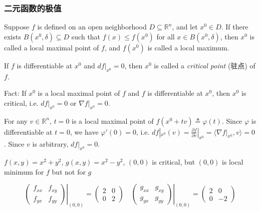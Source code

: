 \subsubsection{二元函数的极值}

\begin{definition}
    Suppose $f$ is defined on an open neighborhood $D\subseteq\mathbb{R}^n$, and let $x^0\in D$. If there exists $B(x^0,\delta)\subseteq D$ such that $f(x)\leq f(x^0)$ for all $x\in B(x^0,\delta)$, then $x^0$ is called a local maximal point of $f$, and $f(x^0)$ is called a local maximum.
\end{definition}

\begin{definition}
    If $f$ is differentiable at $x^0$ and $df|_{x^0}=0$, then $x^0$ is called a \emph{critical point} (驻点) of $f$.
\end{definition}

Fact: If $x^0$ is a local maximal point of $f$ and $f$ is differentiable at $x^0$, then $x^0$ is critical, i.e. $df|_{x^0}=0$ or $\nabla f|_{x^0}=0$.

\begin{pf}
    For any $v\in\mathbb{R}^n$, $t=0$ is a local maximal point of $f(x^0+tv)\triangleq\varphi(t)$. Since $\varphi$ is differentiable at $t=0$, we have $\varphi'(0)=0$, i.e. $df|_{x^0}(v)=\frac{\partial f}{\partial v}|_{x^0}=\langle\nabla f|_{x^0}, v\rangle=0$. Since $v$ is arbitrary, $df|_{x^0}=0$.
\end{pf}

\begin{example}
    $f(x,y)=x^2+y^2$, $g(x,y)=x^2-y^2$, $(0,0)$ is critical, but $(0,0)$ is local minimum for $f$ but not for $g$
\end{example}

$$\left.\begin{pmatrix}
        f_{xx} & f_{xy} \\
        f_{yx} & f_{yy}
    \end{pmatrix}\right|_{(0,0)}=\begin{pmatrix}
        2 & 0 \\
        0 & 2
    \end{pmatrix}\quad\left.\begin{pmatrix}
        g_{xx} & g_{xy} \\
        g_{yx} & g_{yy}
    \end{pmatrix}\right|_{(0,0)}=\begin{pmatrix}
        2 & 0  \\
        0 & -2
    \end{pmatrix}
$$

